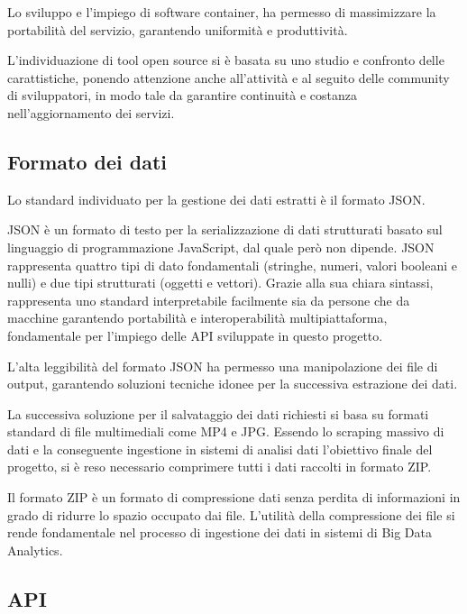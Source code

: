 Lo sviluppo e l'impiego di software container, ha permesso di massimizzare la portabilit\`a del servizio, garantendo uniformit\`a e produttivit\`a.

L'individuazione di tool open source si \`e basata su uno studio e confronto delle carattistiche, ponendo attenzione anche all'attivit\`a e al seguito delle community di sviluppatori, in modo tale da garantire continuit\`a e costanza nell'aggiornamento dei servizi.

\subsection{Formato dei dati}\label{formato dati}

Lo standard individuato per la gestione dei dati estratti \`e il formato JSON.

JSON \`e un formato di testo per la serializzazione di dati strutturati basato sul linguaggio di programmazione JavaScript, dal quale per\`o non dipende.
JSON rappresenta quattro tipi di dato fondamentali (stringhe, numeri, valori booleani e nulli) e due tipi strutturati (oggetti e vettori).\cite{bray2014javascript}
Grazie alla sua chiara sintassi, rappresenta uno standard interpretabile facilmente sia da persone che da macchine garantendo portabilit\`a e interoperabilit\`a multipiattaforma, fondamentale per l'impiego delle API sviluppate in questo progetto.

L'alta leggibilit\`a del formato JSON ha permesso una manipolazione dei file di output, garantendo soluzioni tecniche idonee per la successiva estrazione dei dati.

La successiva soluzione per il salvataggio dei dati richiesti si basa su formati standard di file multimediali come MP4 e JPG. Essendo lo scraping massivo di dati e la conseguente ingestione in sistemi di analisi dati l'obiettivo finale del progetto, si \`e reso necessario comprimere tutti i dati raccolti in formato ZIP.

Il formato ZIP \cite{zip} è un formato di compressione dati senza perdita di informazioni in grado di ridurre lo spazio occupato dai file.
L'utilit\`a della compressione dei file si rende fondamentale nel processo di ingestione dei dati in sistemi di Big Data Analytics.



\subsection{API}

